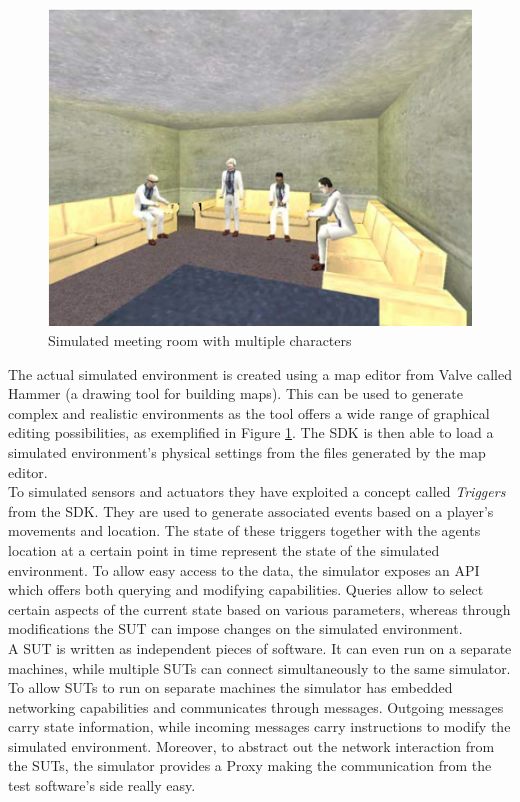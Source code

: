 \begin{figure}[H]
	\centering
	\includegraphics[width=\linewidth]{gfx/Chapter2/tatus_simulated_meeting_room}
	\caption{Simulated meeting room with multiple characters}
	\label{fig:tatus_simulated_meeting_room}
\end{figure}

The actual simulated environment is created using a map editor from Valve called Hammer (a drawing tool for building maps). This can be used to generate complex and realistic environments as the tool offers a wide range of graphical editing possibilities, as exemplified in Figure \ref{fig:tatus_simulated_meeting_room}. The SDK is then able to load a simulated environment's physical settings from the files generated by the map editor.\\

To simulated sensors and actuators they have exploited a concept called \emph{Triggers} from the SDK. They are used to generate associated events based on a player's movements and location. The state of these triggers together with the agents location at a certain point in time represent the state of the simulated environment. To allow easy access to the data, the simulator exposes an API which offers both querying and modifying capabilities. Queries allow to select certain aspects of the current state based on various parameters, whereas through modifications the SUT can impose changes on the simulated environment.\\

A SUT is written as independent pieces of software. It can even run on a separate machines, while multiple SUTs can connect simultaneously to the same simulator. To allow SUTs to run on separate machines the simulator has embedded networking capabilities and communicates through messages. Outgoing messages carry state information, while incoming messages carry instructions to modify the simulated environment. Moreover, to abstract out the network interaction from the SUTs, the simulator provides a Proxy making the communication from the test software's side really easy.\\


